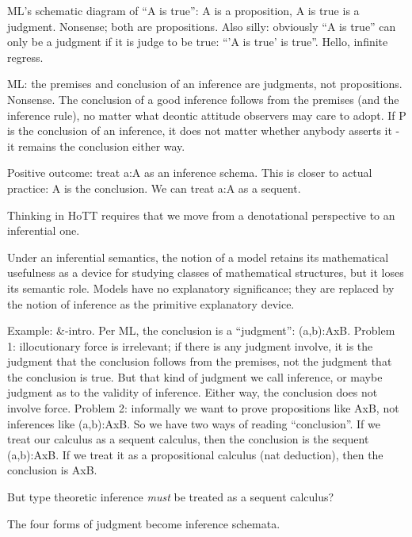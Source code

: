 \documentclass{article}
\begin{document}
ML's schematic diagram of ``A is true'': A is a proposition, A is true
is a judgment.  Nonsense; both are propositions.  Also silly:
obviously ``A is true'' can only be a judgment if it is judge to be
true: ``'A is true' is true''.  Hello, infinite regress.

ML: the premises and conclusion of an inference are judgments, not
propositions.  Nonsense.  The conclusion of a good inference follows
from the premises (and the inference rule), no matter what deontic
attitude observers may care to adopt.  If P is the conclusion of an
inference, it does not matter whether anybody asserts it - it remains
the conclusion either way.

Positive outcome: treat a:A as an inference schema.  This is closer to
actual practice: A is the conclusion.  We can treat a:A as a sequent.

Thinking in HoTT requires that we move from a denotational perspective
to an inferential one.

Under an inferential semantics, the notion of a model retains its
mathematical usefulness as a device for studying classes of
mathematical structures, but it loses its semantic role.  Models have
no explanatory significance; they are replaced by the notion of
inference as the primitive explanatory device.

Example: \&-intro.  Per ML, the conclusion is a ``judgment'':
(a,b):AxB.  Problem 1: illocutionary force is irrelevant; if there is
any judgment involve, it is the judgment that the conclusion follows
from the premises, not the judgment that the conclusion is true.  But
that kind of judgment we call inference, or maybe judgment as to the
validity of inference.  Either way, the conclusion does not involve
force.  Problem 2: informally we want to prove propositions like AxB,
not inferences like (a,b):AxB.  So we have two ways of reading
``conclusion''.  If we treat our calculus as a sequent calculus, then
the conclusion is the sequent (a,b):AxB.  If we treat it as a
propositional calculus (nat deduction), then the conclusion is AxB.

But type theoretic inference \emph{must} be treated as a sequent
calculus?

The four forms of judgment become inference schemata.
\end{document}
